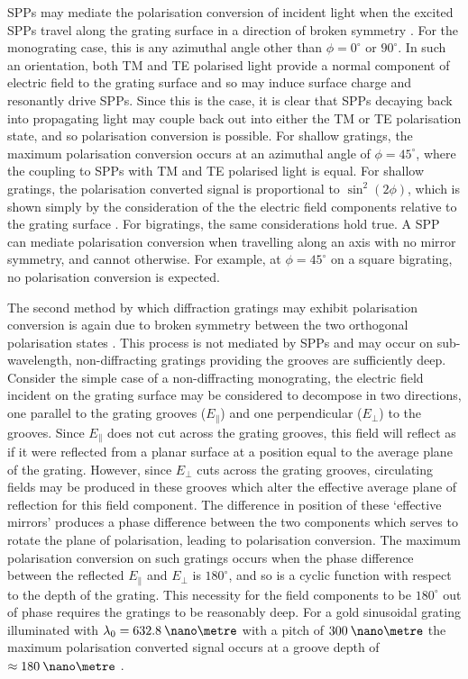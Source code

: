 SPPs may mediate the polarisation conversion of incident light when the excited SPPs travel along the grating surface in a direction of broken symmetry \cite{Bryan-Brown1990,Depine2001,Elston1991,Inagaki:86}. For the monograting case, this is any azimuthal angle other than $\phi = 0^\circ$ or $90^\circ$. In such an orientation, both TM and TE polarised light provide a normal component of electric field to the grating surface and so may induce surface charge and resonantly drive SPPs. Since this is the case, it is clear that SPPs decaying back into propagating light may couple back out into either the TM or TE polarisation state, and so polarisation conversion is possible. For shallow gratings, the maximum polarisation conversion occurs at an azimuthal angle of $\phi=45^\circ$, where the coupling to SPPs with TM and TE polarised light is equal. For shallow gratings, the polarisation converted signal is proportional to $\sin^2 (2\phi)$, which is shown simply by the consideration of the the electric field components relative to the grating surface \cite{Bryan-Brown1990}. 
For bigratings, the same considerations hold true. A SPP can mediate polarisation conversion when travelling along an axis with no mirror symmetry, and cannot otherwise. For example, at $\phi=45^\circ$ on a square bigrating, no polarisation conversion is expected. 

The second method by which diffraction gratings may exhibit polarisation conversion is again due to broken symmetry between the two orthogonal polarisation states \cite{Watts1997a}. This process is not mediated by SPPs and may occur on sub-wavelength, non-diffracting gratings providing the grooves are sufficiently deep. Consider the simple case of a non-diffracting monograting, the electric field incident on the grating surface may be considered to decompose in two directions, one parallel to the grating grooves  ($E_\parallel$) and one perpendicular ($E_\perp$) to the grooves. Since $E_\parallel$ does not cut across the grating grooves, this field will reflect as if it were reflected from a planar surface at a position equal to the average plane of the grating. However, since $E_\perp$ cuts across the grating grooves, circulating fields may be produced in these grooves which alter the effective average plane of reflection for this field component. The difference in position of these `effective mirrors' produces a phase difference between the two components which serves to rotate the plane of polarisation, leading to polarisation conversion. The maximum polarisation conversion on such gratings occurs when the phase difference between the reflected $E_\parallel$ and $E_\perp$ is $180^\circ$, and so is a cyclic function with respect to the depth of the grating. This necessity for the field components to be $180^\circ$ out of phase requires the gratings to be reasonably deep. For a gold sinusoidal grating illuminated with $\lambda_0=632.8\:\nano\metre$ with a pitch of $300\:\nano\metre$ the maximum polarisation converted signal occurs at a groove depth of $\approx 180\:\nano\metre$ \cite{Watts1997a}.

